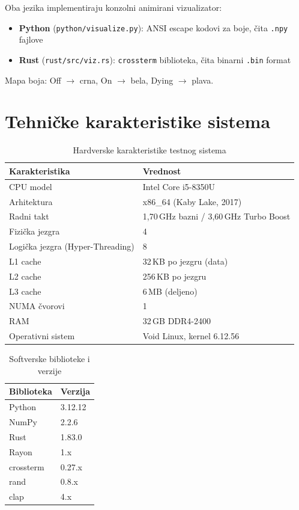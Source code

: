 \documentclass[12pt,a4paper]{article}
\begin{document}
Oba jezika implementiraju konzolni animirani vizualizator:
\begin{itemize}[noitemsep]
    \item \textbf{Python} (\texttt{python/visualize.py}): ANSI escape kodovi za boje,
          čita \texttt{.npy} fajlove
    \item \textbf{Rust} (\texttt{rust/src/viz.rs}): \texttt{crossterm} biblioteka,
          čita binarni \texttt{.bin} format
\end{itemize}
Mapa boja: Off $\to$ crna, On $\to$ bela, Dying $\to$ plava.

\section{Tehničke karakteristike sistema}

\begin{table}[H]
    \centering
    \caption{Hardverske karakteristike testnog sistema}
    \begin{tabular}{ll}
        \toprule
        \textbf{Karakteristika} & \textbf{Vrednost} \\
        \midrule
        CPU model & Intel Core i5-8350U \\
        Arhitektura & x86\_64 (Kaby Lake, 2017) \\
        Radni takt & 1{,}70\,GHz bazni / 3{,}60\,GHz Turbo Boost \\
        Fizička jezgra & 4 \\
        Logička jezgra (Hyper-Threading) & 8 \\
        L1 cache & 32\,KB po jezgru (data) \\
        L2 cache & 256\,KB po jezgru \\
        L3 cache & 6\,MB (deljeno) \\
        NUMA čvorovi & 1 \\
        RAM & 32\,GB DDR4-2400 \\
        Operativni sistem & Void Linux, kernel 6.12.56 \\
        \bottomrule
    \end{tabular}
\end{table}

\begin{table}[H]
    \centering
    \caption{Softverske biblioteke i verzije}
    \begin{tabular}{ll}
        \toprule
        \textbf{Biblioteka} & \textbf{Verzija} \\
        \midrule
        Python & 3.12.12 \\
        NumPy & 2.2.6 \\
        Rust & 1.83.0 \\
        Rayon & 1.x \\
        crossterm & 0.27.x \\
        rand & 0.8.x \\
        clap & 4.x \\
        \bottomrule
    \end{tabular}
\end{table}
\end{document}
